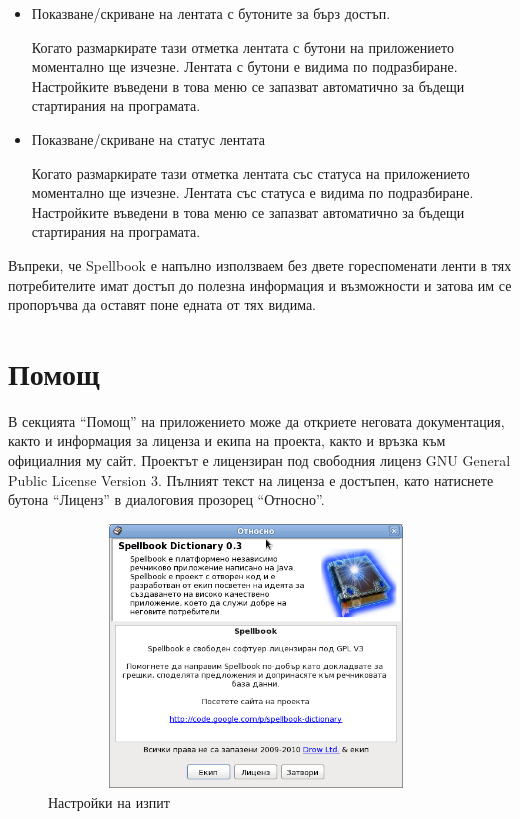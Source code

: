 \begin{itemize}
  \item Показване/скриване на лентата с бутоните за бърз достъп.

    Когато размаркирате тази отметка лентата с бутони на приложението
    моментално ще изчезне. Лентата с бутони е видима по
    подразбиране. Настройките въведени в това меню се запазват
    автоматично за бъдещи стартирания на програмата.

    \item Показване/скриване на статус лентата

      Когато размаркирате тази отметка лентата със статуса на приложението
    моментално ще изчезне. Лентата със статуса е видима по
    подразбиране. Настройките въведени в това меню се запазват
    автоматично за бъдещи стартирания на програмата.

\end{itemize}

Въпреки, че Spellbook е напълно използваем без двете гореспоменати
ленти в тях потребителите имат достъп до полезна информация и
възможности и затова им се пропоръчва да оставят поне едната от тях видима.

\section{Помощ}

В секцията "`Помощ"' на приложението може да откриете неговата
документация, както и информация за лиценза и екипа на проекта, както
и връзка към официалния му сайт. Проектът е лицензиран под свободния
лиценз GNU General Public License Version 3. Пълният текст на лиценза
е достъпен, като натиснете бутона "`Лиценз"' в диалоговия прозорец
"`Относно"'.

\begin{figure}[htbp]
  \caption{Настройки на изпит}
  \centering
  \includegraphics[width=110mm, height=70mm]{images/about_dialog.png}
\end{figure}


